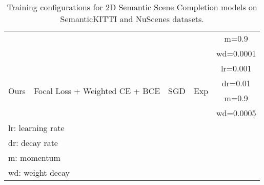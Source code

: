 \documentclass{article}
\begin{document}
\begin{table}[htb]
\begin{adjustbox}{max width=\textwidth}
\begin{tabular}{ccccc}
\multicolumn{1}{|c|}{}                            & \multicolumn{1}{c|}{}                                              & \multicolumn{1}{c|}{}                         & \multicolumn{1}{c|}{}                      & \multicolumn{1}{c|}{m=0.9}          \\ \cline{5-5} 
\multicolumn{1}{|c|}{}                            & \multicolumn{1}{c|}{}                                              & \multicolumn{1}{c|}{}                         & \multicolumn{1}{c|}{}                      & \multicolumn{1}{c|}{wd=0.0001}      \\ \hline
\multicolumn{1}{|c|}{\multirow{4}{*}{Ours}}       & \multicolumn{1}{c|}{\multirow{4}{*}{Focal Loss + Weighted CE + BCE}}                             & \multicolumn{1}{c|}{\multirow{4}{*}{SGD}}     & \multicolumn{1}{c|}{\multirow{4}{*}{Exp}}  & \multicolumn{1}{c|}{lr=0.001}       \\ \cline{5-5} 
\multicolumn{1}{|c|}{}                            & \multicolumn{1}{c|}{}                                              & \multicolumn{1}{c|}{}                         & \multicolumn{1}{c|}{}                      & \multicolumn{1}{c|}{dr=0.01}        \\ \cline{5-5} 
\multicolumn{1}{|c|}{}                            & \multicolumn{1}{c|}{}                                              & \multicolumn{1}{c|}{}                         & \multicolumn{1}{c|}{}                      & \multicolumn{1}{c|}{m=0.9}          \\ \cline{5-5} 
\multicolumn{1}{|c|}{}                            & \multicolumn{1}{c|}{}                                              & \multicolumn{1}{c|}{}                         & \multicolumn{1}{c|}{}                      & \multicolumn{1}{c|}{wd=0.0005}      \\ \hline
\multicolumn{5}{l}{lr: learning rate}                                                                                                                                                                                                                     \\
\multicolumn{5}{l}{dr: decay rate}                                                                                                                                                                                                                        \\
\multicolumn{5}{l}{m: momentum}                                                                                                                                                                                                                           \\
\multicolumn{5}{l}{wd: weight decay}                                                                                                                             
\end{tabular}
\end{adjustbox}
\caption{Training configurations for 2D Semantic Scene Completion models on SemanticKITTI and NuScenes datasets.}
\label{table: 2d_training_configs}
\end{table}
\end{document}
